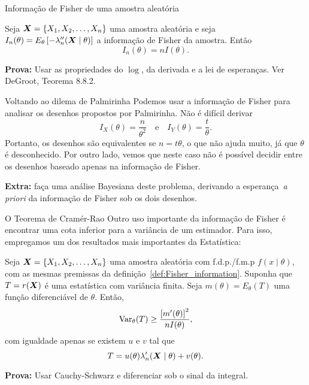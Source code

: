 \begin{frame}{Informação de Fisher de uma amostra aleatória}

\begin{theo}
 \label{thm:Fisher_information_random_sample}
 Seja $\boldsymbol{X} = \{ X_1, X_2, \ldots, X_n \}$ uma amostra aleatória e seja $I_n(\theta) = E_\theta \left[-\lambda_n^{\prime\prime}(\boldsymbol{X} \mid \theta) \right]$ a informação de Fisher da amostra.
 Então
 \begin{equation*}
  I_n(\theta) = nI(\theta).
 \end{equation*} 
\end{theo}
\textbf{Prova:} Usar as propriedades do $\log$, da derivada e a lei de esperanças.
Ver DeGroot, Teorema 8.8.2.
\end{frame}

\begin{frame}{Voltando ao dilema de Palmirinha}
Podemos usar a informação de Fisher para analisar os desenhos propostos por Palmirinha.
Não é difícil derivar
\begin{equation*}
\label{eq:poisson_process_informationMatrix}
 I_X(\theta) = \frac{n}{\theta^2}\quad\text{e}\quad I_Y(\theta) = \frac{t}{\theta}.
\end{equation*}
Portanto, os desenhos são equivalentes se $n = t\theta$, o que não ajuda muito, já que $\theta$ é desconhecido.
Por outro lado, vemos que neste caso não é possível decidir entre os desenhos baseado apenas na informação de Fisher.

\textbf{Extra:} faça uma análise Bayesiana deste problema, derivando a esperança~\textit{a priori} da informação de Fisher sob os dois desenhos.
 \end{frame}

 \begin{frame}{O Teorema de Cramér-Rao}
Outro uso importante da informação de Fisher é encontrar uma cota inferior para a variância de um estimador.
Para isso, empregamos um dos resultados mais importantes da Estatística:
\begin{theo}
 \label{thm:Cramer_Rao_theorem}
 Seja $\boldsymbol{X} = \{ X_1, X_2, \ldots, X_n \}$ uma amostra aleatória com f.d.p./f.m.p $f(x\mid\theta)$, com as mesmas premissas da definição~\ref{def:Fisher_information}.
 Suponha que $T = r(\boldsymbol{X})$ é uma estatística com variância finita.
 Seja $m(\theta) = E_\theta(T)$ uma função diferenciável de $\theta$.
 Então,
 \begin{equation}
  \label{eq:Cramer_Rao_theorem}
  \operatorname{Var}_\theta(T) \geq \frac{\left[m^\prime(\theta)\right]^2}{nI(\theta)},
 \end{equation}
 com igualdade apenas se existem $u$ e $v$ tal que 
 \[ T = u(\theta)\lambda_n^\prime(\boldsymbol{X} \mid \theta) + v(\theta). \]
\end{theo}
\textbf{Prova:} Usar Cauchy-Schwarz e diferenciar sob o sinal da integral.
\end{frame}

